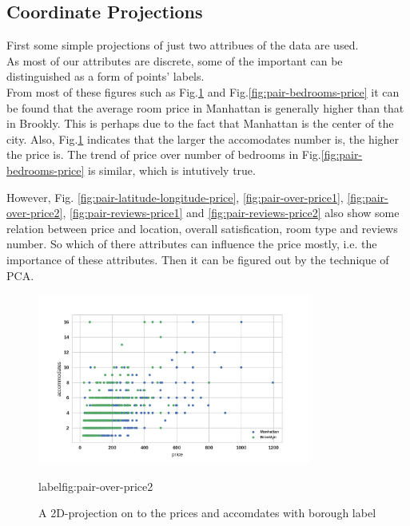 \documentclass[12pt]{article}
\begin{document}
\subsection{Coordinate Projections}
First some simple projections of just two attribues of the data are used.\\
As most of our attributes are discrete, some of the important can be distinguished as a form of points' labels.  
\\ From most of these figures such as Fig.\ref{fig:pair-acc-price} and Fig.\ref{fig:pair-bedrooms-price} it can be found that the average room price in Manhattan is generally higher than that in Brookly. This is perhaps due to the fact that Manhattan is the center of the city. Also, Fig.\ref{fig:pair-acc-price} indicates that the larger the accomodates number is, the higher the price is. The trend of price over number of bedrooms in Fig.\ref{fig:pair-bedrooms-price} is similar, which is intutively true.
\par However, Fig. \ref{fig:pair-latitude-longitude-price}, \ref{fig:pair-over-price1}, \ref{fig:pair-over-price2}, \ref{fig:pair-reviews-price1} and \ref{fig:pair-reviews-price2} also show some relation  between price and location, overall satisfication, room type and reviews number. So which of there attributes can influence the price mostly, i.e. the importance of these attributes. Then it can be figured out by the technique of PCA.
\begin{figure}[htb]
\centering
\includegraphics[width = 0.8\textwidth]{images/pair-acc-price.png}
\caption{A 2D-projection on to the prices and accomdates with borough label}
\label{fig:pair-acc-price}label{fig:pair-over-price2}
\end{figure}
\end{document}
